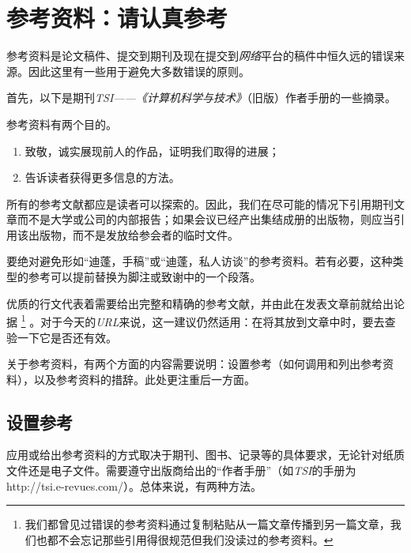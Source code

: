 \chapter{参考资料：请认真参考}

\label{chap6}

参考资料是论文稿件、提交到期刊及现在提交到\emph{网络}平台的稿件中恒久远的错误来源。因此这里有一些用于避免大多数错误的原则。

首先，以下是期刊\emph{TSI——《计算机科学与技术》}（旧版）作者手册的一些摘录。

\begin{mdframed}
    参考资料有两个目的。

    \begin{enumerate}
        \item 致敬，诚实展现前人的作品，证明我们取得的进展；
        \item 告诉读者获得更多信息的方法。
    \end{enumerate}

    所有的参考文献都应是读者可以探索的。因此，我们在尽可能的情况下引用期刊文章而不是大学或公司的内部报告；如果会议已经产出集结成册的出版物，则应当引用该出版物，而不是发放给参会者的临时文件。

    要绝对避免形如“迪蓬，手稿”或“迪蓬，私人访谈”的参考资料。若有必要，这种类型的参考可以提前替换为脚注或致谢中的一个段落。
\end{mdframed}

优质的行文代表着需要给出完整和精确的参考文献，并由此在发表文章前就给出论据
    \footnote{我们都曾见过错误的参考资料通过复制粘贴从一篇文章传播到另一篇文章，我们也都不会忘记那些引用得很规范但我们没读过的参考资料。}
。对于今天的\emph{URL}来说，这一建议仍然适用：在将其放到文章中时，要去查验一下它是否还有效。

关于参考资料，有两个方面的内容需要说明：设置参考（如何调用和列出参考资料），以及参考资料的措辞。此处更注重后一方面。

\section{设置参考}

应用或给出参考资料的方式取决于期刊、图书、记录等的具体要求，无论针对纸质文件还是电子文件。需要遵守出版商给出的“作者手册”（如\emph{TSI}的手册为http://tsi.e-revues.com/）。总体来说，有两种方法。


